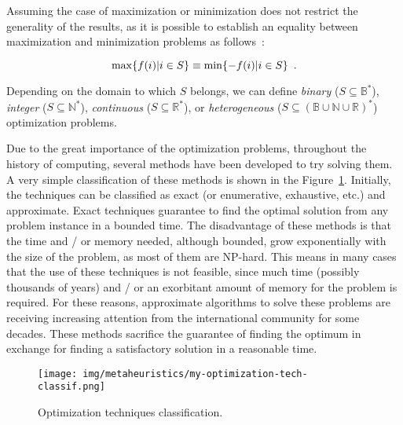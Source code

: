 Assuming the case of maximization or minimization does not restrict the generality of the results, as it is possible to establish an equality between maximization and minimization problems as follows~\cite{baeck96evolutionary,goldberg89genetic}:

\begin{equation}
\max \{f(i) | i \in S \} \equiv \min \{-f(i) | i \in S \} \enspace. \vspace{0.3cm}
\end{equation}

Depending on the domain to which $S$ belongs, we can define \emph{binary} ($S\subseteq \mathbb{B}^\ast$), \emph{integer} ($S\subseteq \mathbb{N}^\ast$), \emph{continuous} ($S\subseteq \mathbb{R}^\ast$),
or \emph{heterogeneous} ($S\subseteq (\mathbb{B} \cup \mathbb{N} \cup
\mathbb{R})^\ast$) optimization problems.

Due to the great importance of the optimization problems, throughout the history of computing, several methods have been developed to try solving them. A very simple classification of these methods is shown in the Figure~\ref{fig:OptTechClass}. Initially, the techniques can be classified as exact (or enumerative, exhaustive, etc.) and approximate. Exact techniques guarantee to find the optimal solution from any problem instance in a bounded time. The disadvantage of these methods is that the time and / or memory needed, although bounded, grow exponentially with the size of the problem, as most of them are NP-hard. This means in many cases that the use of these techniques is not feasible, since much time  (possibly thousands of years) and / or an exorbitant amount of memory for the problem is required. For these reasons, approximate algorithms to solve these problems are receiving increasing attention from the international community for some decades. These methods sacrifice the guarantee of finding the optimum in exchange for finding a satisfactory solution in a reasonable time.

\begin{figure}[H] %
	\vspace{0.5cm} \centering \texttt{[image: img/metaheuristics/my-optimization-tech-classif.png]}
	\caption{Optimization techniques classification.}\label{fig:OptTechClass} \vspace{0.5cm}
\end{figure}

